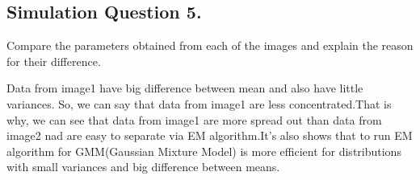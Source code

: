 \documentclass[12pt]{article}
\begin{document}
\subsection{Simulation Question 5.}
Compare the parameters obtained from each of the images and explain the reason for their difference.
\begin{qsolve}
    Data from image1 have big difference between mean and also have little variances. So, we can say that data from image1 are less concentrated.That is why, we can see that data from image1 are more spread out than data from image2 nad are easy to separate via EM algorithm.It's also shows that to run EM algorithm for GMM(Gaussian Mixture Model) is more efficient for distributions with small variances and big difference between means.
\end{qsolve}





\makeendpage
\end{document}
